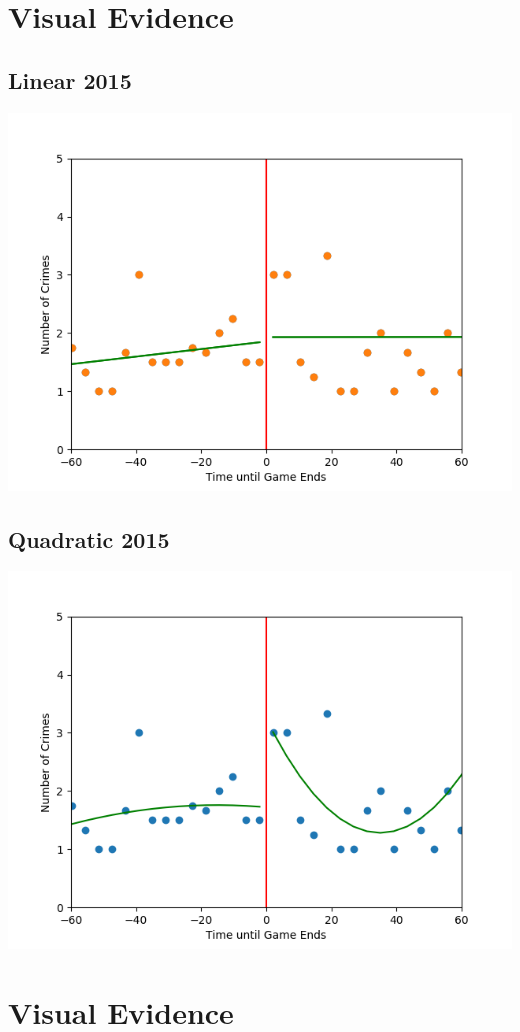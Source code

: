 \documentclass{article}
\begin{document}
\newpage
\section{Visual Evidence}
\subsection*{Linear 2015}
\includegraphics[scale = .65]{Linear2015}

\subsection*{Quadratic 2015}
\includegraphics[scale = .65]{quad2015}

\section{Visual Evidence}
\end{document}
